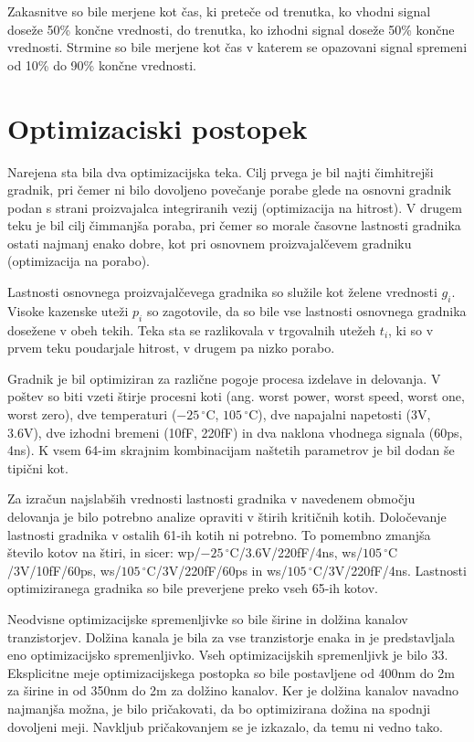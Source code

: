 \documentclass[journal,a4paper,twoside]{template/IEEEtran}
\begin{document}
Zakasnitve so bile merjene kot čas, ki preteče od trenutka, ko vhodni signal doseže 50\% končne vrednosti, do trenutka, ko izhodni signal doseže 50\% končne vrednosti. Strmine so bile merjene kot čas v katerem se opazovani signal spremeni od 10\% do 90\% končne vrednosti.

\section{Optimizaciski postopek}
Narejena sta bila dva optimizacijska teka. Cilj prvega je bil najti čimhitrejši gradnik, pri čemer ni bilo dovoljeno povečanje porabe glede na osnovni gradnik podan s strani proizvajalca integriranih vezij (optimizacija na hitrost). V drugem teku je bil cilj čimmanjša poraba, pri čemer so morale časovne lastnosti gradnika ostati najmanj enako dobre, kot pri osnovnem proizvajalčevem gradniku (optimizacija na porabo).

Lastnosti osnovnega proizvajalčevega gradnika so služile kot želene vrednosti $g_i$. Visoke kazenske uteži $p_i$ so zagotovile, da so bile vse lastnosti osnovnega gradnika dosežene v obeh tekih. Teka sta se razlikovala v trgovalnih utežeh $t_i$, ki so v prvem teku poudarjale hitrost, v drugem pa nizko porabo.

Gradnik je bil optimiziran za različne pogoje procesa izdelave in delovanja. V poštev so biti vzeti štirje procesni koti (ang. worst power, worst speed, worst one, worst zero), dve temperaturi ($-25\,^{\circ}\mathrm{C}$, $105\,^{\circ}\mathrm{C}$), dve napajalni napetosti (3V, 3.6V), dve izhodni bremeni (10fF, 220fF) in dva naklona vhodnega signala (60ps, 4ns). K vsem 64-im skrajnim kombinacijam naštetih parametrov je bil dodan še tipični kot.

Za izračun najslabših vrednosti lastnosti gradnika v navedenem območju delovanja je bilo potrebno analize opraviti v štirih kritičnih kotih. Določevanje lastnosti gradnika v ostalih 61-ih kotih ni potrebno. To pomembno zmanjša število kotov na štiri, in sicer: wp/$-25\,^{\circ}\mathrm{C}$/3.6V/220fF/4ns, ws/$105\,^{\circ}\mathrm{C}$/3V/10fF/60ps, ws/$105\,^{\circ}\mathrm{C}$/3V/220fF/60ps in ws/$105\,^{\circ}\mathrm{C}$/3V/220fF/4ns. Lastnosti optimiziranega gradnika so bile preverjene preko vseh 65-ih kotov.

Neodvisne optimizacijske spremenljivke so bile širine in dolžina kanalov tranzistorjev. Dolžina kanala je bila za vse tranzistorje enaka in je predstavljala eno optimizacijsko spremenljivko. Vseh optimizacijskih spremenljivk je bilo 33. Eksplicitne meje optimizacijskega postopka so bile postavljene od 400nm do 2\textmu m za širine in od 350nm do 2\textmu m za dolžino kanalov. Ker je dolžina kanalov navadno najmanjša možna, je bilo pričakovati, da bo optimizirana dožina na spodnji dovoljeni meji. Navkljub pričakovanjem se je izkazalo, da temu ni vedno tako.
\end{document}
